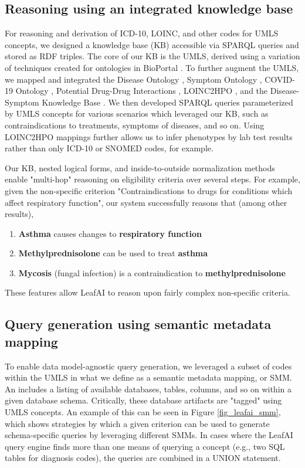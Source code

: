 \documentclass[../main.tex]{subfiles}
\begin{document}
\subsection*{Reasoning using an integrated knowledge base}

For reasoning and derivation of ICD-10, LOINC, and other codes for UMLS concepts, we designed a knowledge base (KB) accessible via SPARQL queries and stored as RDF triples. The core of our KB is the UMLS, derived using a variation of techniques created for ontologies in BioPortal \cite{noy2009bioportal}. To further augment the UMLS, we mapped and integrated the Disease Ontology \cite{schriml2012disease}, Symptom Ontology \cite{sayers2010database}, COVID-19 Ontology \cite{sargsyan2020covid}, Potential Drug-Drug Interactions \cite{ayvaz2015toward}, LOINC2HPO \cite{zhang2019semantic}, and the Disease-Symptom Knowledge Base \cite{wang2008automated}. We then developed SPARQL queries parameterized by UMLS concepts for various scenarios which leveraged our KB, such as contraindications to treatments, symptoms of diseases, and so on. Using LOINC2HPO mappings further allows us to infer phenotypes by lab test results rather than only ICD-10 or SNOMED codes, for example. 

Our KB, nested logical forms, and inside-to-outside normalization methods enable "multi-hop" reasoning on eligibility criteria over several steps. For example, given the non-specific criterion "Contraindications to drugs for conditions which affect respiratory function", our system successfully reasons that (among other results),

\begin{enumerate}
    \item \textbf{Asthma} causes changes to \textbf{respiratory function}
    \item \textbf{Methylprednisolone} can be used to treat \textbf{asthma}
    \item \textbf{Mycosis} (fungal infection) is a contraindication to \textbf{methylprednisolone}
\end{enumerate}

\noindent These features allow LeafAI to reason upon fairly complex non-specific criteria.

\subsection*{Query generation using semantic metadata mapping}

To enable data model-agnostic query generation, we leveraged a subset of codes within the UMLS in what we define as a semantic metadata mapping, or SMM. An includes a listing of available databases, tables, columns, and so on within a given database schema. Critically, these database artifacts are "tagged" using UMLS concepts. An example of this can be seen in Figure \ref{fig_leafai_smm}, which shows strategies by which a given criterion can be used to generate schema-specific queries by leveraging different SMMs. In cases where the LeafAI query engine finds more than one means of querying a concept (e.g., two SQL tables for diagnosis codes), the queries are combined in a UNION statement.
\end{document}
